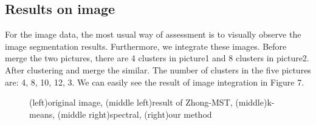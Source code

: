 	\subsection{Results on image}
		For the image data, the most usual way of assessment is to visually observe the image segmentation results. Furthermore, we integrate these images. Before merge the two pictures, there are 4 clusters in picture1 and 8 clusters in picture2. After clustering and merge the similar. The number of clusters in the five pictures are: 4, 8, 10, 12, 3. We can easily see the result of image integration in Figure 7.

		\begin{figure}[htb]
			\centering





			\caption{(left)original image, (middle left)result of Zhong-MST, (middle)k-means, (middle right)spectral, (right)our method }
		\end{figure}

